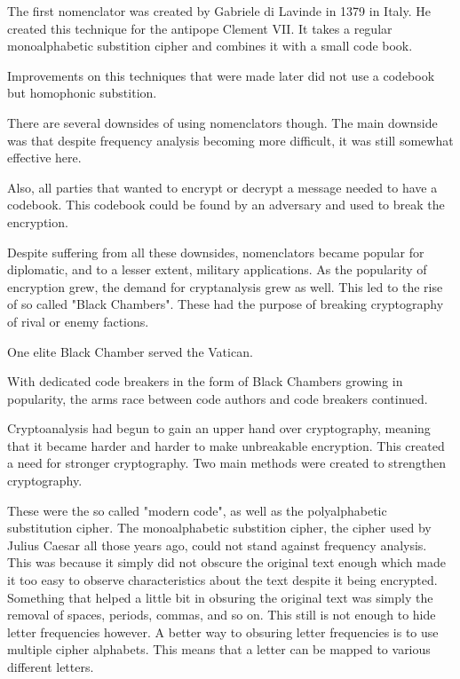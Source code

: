 \documentclass{article}
\begin{document}
    The first nomenclator was created by Gabriele di Lavinde in 1379 in Italy.
    He created this technique for the antipope Clement VII.
    It takes a regular monoalphabetic substition cipher and combines it with a
    small code book.

    Improvements on this techniques that were made later did not use a codebook
    but homophonic substition.

    There are several downsides of using nomenclators though. The main
    downside was that despite frequency analysis becoming more difficult,
    it was still somewhat effective here.
    
    Also, all parties that wanted to encrypt or decrypt a message needed
    to have a codebook. This codebook could be found by an adversary and
    used to break the encryption.

    Despite suffering from all these downsides, nomenclators became popular
    for diplomatic, and to a lesser extent, military applications.
    As the popularity of encryption grew, the demand for cryptanalysis grew
    as well.
    This led to the rise of so called "Black Chambers". These had the purpose
    of breaking cryptography of rival or enemy factions.

    One elite Black Chamber served the Vatican.

    With dedicated code breakers in the form of Black Chambers
    growing in popularity, the arms race
    between code authors and code breakers continued.

    Cryptoanalysis had begun to gain an upper hand over cryptography,
    meaning that it became harder and harder to make unbreakable
    encryption.
    This created a need for stronger cryptography.
    Two main methods were created to strengthen cryptography.

    These were the so called "modern code", as well as the polyalphabetic substitution
    cipher.
    The monoalphabetic substition cipher, the cipher used by Julius Caesar all those
    years ago, could not stand against frequency analysis. This was
    because it simply did not obscure the original text enough
    which made it too easy to observe characteristics about the text
    despite it being encrypted. Something that helped a little bit
    in obsuring the original text was simply the removal of spaces, periods, commas,
    and so on.
    This still is not enough to hide letter frequencies however.
    A better way to obsuring letter frequencies is to use multiple cipher alphabets.
    This means that a letter can be mapped to various different letters.
\end{document}
